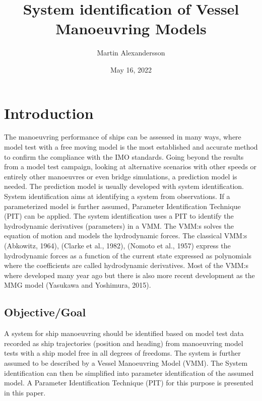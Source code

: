 \documentclass[review]{elsarticle}
\title{System identification of Vessel Manoeuvring Models}
\date{May 16, 2022}
\author{Martin Alexandersson}
\begin{document}



\pagestyle{empty}

\pagestyle{plain}

\pagestyle{normal}
\label{\detokenize{index::doc}}



\section{Introduction}
\label{\detokenize{00.02_introduction:introduction}}\label{\detokenize{00.02_introduction::doc}}
\sphinxAtStartPar
The manoeuvring performance of ships can be assessed in many ways, where model test with a free moving model is the most established and accurate method to confirm the compliance with the IMO standards. Going beyond the results from a model test campaign, looking at alternative scenarios with other speeds or entirely other manoeuvres or even bridge simulations, a prediction model is needed. The prediction model is usually developed with system identification.
System identification aims at identifying a system from observations. If a parameterized model is further assumed, Parameter Identification Technique (PIT) can be applied. The system identification uses a PIT to identify the hydrodynamic derivatives (parameters) in a VMM. The VMM:s solves the equation of motion and models the hydrodynamic forces.
The classical VMM:s (Abkowitz, 1964), (Clarke et al., 1982), (Nomoto et al., 1957) express the hydrodynamic forces as a function of the current state expressed as polynomials where the coefficients are called hydrodynamic derivatives. Most of the VMM:s where developed many year ago but there is also more recent development as the MMG model (Yasukawa and Yoshimura, 2015).


\subsection{Objective/Goal}
\label{\detokenize{00.02_introduction:objective-goal}}
\sphinxAtStartPar
A system for ship manoeuvring should be identified based on model test data recorded as ship trajectories (position and heading) from manoeuvring model tests with a ship model free in all degrees of freedoms. The system is further assumed to be described by a Vessel Manoeuvring Model (VMM). The System identification can then be simplified into parameter identification of the assumed model. A Parameter Identification Technique (PIT) for this purpose is presented in this paper.
\end{document}
